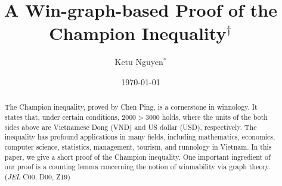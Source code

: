 \documentclass[AER]{AEA}
\begin{document}
\setcounter{page}{9}

\title{A Win-graph-based Proof of the Champion Inequality$^\dagger$}

\author{Ketu Nguyen$^*$}

\date{\today}

\begin{abstract}
The Champion inequality, proved by Chen Ping, is a cornerstone in winnology. It states that, under certain conditions, $2000 > 3000$ holds, where the units of the both sides above are Vietnamese Dong (VND) and US dollar (USD), respectively. The inequality has profound applications in many fields, including mathematics, economics, computer science, statistics, management, tourism, and runnology in Vietnam. In this paper, we give a short proof of the Champion inequality. One important ingredient of our proof is a counting lemma concerning the notion of winmability via graph theory.
\noindent (\textit{JEL} C00, D00, Z19)
\end{abstract}

\maketitle

\let\thefootnote\relax{}
\let\thefootnote\relax{}

\def\thefootnote{\arabic{footnote}}
\setcounter{footnote}{0}

\end{document}
